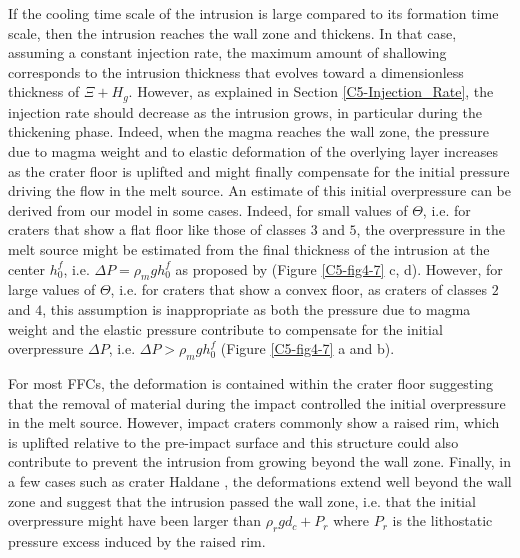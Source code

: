 If the  cooling time scale of  the intrusion is large  compared to its
formation time  scale, then  the intrusion reaches  the wall  zone and
thickens.   In that  case,  assuming a  constant  injection rate,  the
maximum amount  of shallowing  corresponds to the  intrusion thickness
that  evolves  toward  a  dimensionless  thickness  of  $\Xi  +  H_g$.
However,   as  explained   in  Section   \ref{C5-Injection_Rate},  the
injection rate should  decrease as the intrusion  grows, in particular
during the thickening phase.  Indeed,  when the magma reaches the wall
zone, the pressure  due to magma weight and to  elastic deformation of
the  overlying layer  increases as  the crater  floor is  uplifted and
might finally compensate for the  initial pressure driving the flow in
the  melt source.   An estimate  of this  initial overpressure  can be
derived from  our model in  some cases.   Indeed, for small  values of
$\Theta$,  i.e. for  craters  that show  a flat  floor  like those  of
classes $3$  and $5$,  the overpressure  in the  melt source  might be
estimated  from the  final thickness  of the  intrusion at  the center
$h_0^f$,   i.e.    $\Delta    P=\rho_{m}gh_{0}^f$   as   proposed   by
\citet{Jozwiak:2012dq}  (Figure \ref{C5-fig4-7}  c,  d). However,  for
large values of $\Theta$, i.e.  for  craters that show a convex floor,
as craters of classes $2$ and $4$, this assumption is inappropriate as
both  the  pressure due  to  magma  weight  and the  elastic  pressure
contribute to compensate for the initial overpressure $\Delta P$, i.e.
$\Delta P> \rho_m gh_0^f$ (Figure \ref{C5-fig4-7} a and b).
	
For most  FFCs, the deformation  is contained within the  crater floor
\citep{Schultz:1976kt} suggesting that the  removal of material during
the impact  controlled the  initial overpressure  in the  melt source.
However, impact craters commonly show  a raised rim, which is uplifted
relative  to the  pre-impact  surface and  this  structure could  also
contribute to prevent the intrusion from growing beyond the wall zone.
Finally, in a few cases such as crater Haldane \citep{Schultz:1976kt},
the deformations extend well beyond the wall zone and suggest that the
intrusion passed  the wall zone,  i.e.  that the  initial overpressure
might have  been larger than  $\rho_r g d_c  +P_r$ where $P_r$  is the
lithostatic pressure excess induced by the raised rim.
		
